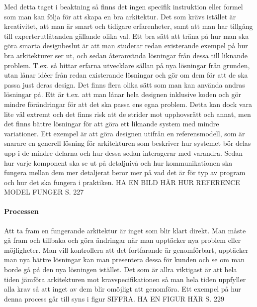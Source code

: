 Med detta taget i beaktning så finns det ingen specifik instruktion eller formel som man kan följa för att skapa en bra arkitektur. Det som krävs istället är kreativitet, att man är smart och tidigare erfarenheter, samt att man har tillgång till experterutlåtanden gällande olika val.
\newline
\newline
Ett bra sätt att träna på hur man ska göra smarta designbeslut är att man studerar redan existerande exempel på hur bra arkitekturer ser ut, och sedan återanvända lösningar från dessa till liknande problem. T.ex. så hittar erfarna utvecklare sällan på nya lösningar från grunden, utan lånar idéer från redan existerande lösningar och gör om dem för att de ska passa just deras design.
\newline
\newline
Det finns flera olika sätt som man kan använda andras lösningar på. Ett är t.ex. att man lånar hela designen inklusive koden och gör mindre förändringar för att det ska passa ens egna problem. Detta kan dock vara lite väl extremt och det finns risk att de strider mot upphovsrätt och annat, men det finns bättre lösningar för att göra ett liknande system med mindre variationer. Ett exempel är att göra designen utifrån en referensmodell, som är snarare en generell lösning för arkitekturen som beskriver hur systemet bör delas upp i de mindre delarna och hur dessa sedan interagerar med varandra. Sedan hur varje komponent ska se ut på detaljnivå och hur kommunikationen ska fungera mellan dem mer detaljerat beror mer på vad det är för typ av program och hur det ska fungera i praktiken.
HA EN BILD HÄR HUR REFERENCE MODEL FUNGER S. 227

\paragraph{Processen}
Att ta fram en fungerande arkitektur är inget som blir klart direkt. Man måste gå fram och tillbaka och göra ändringar när man upptäcker nya problem eller möjligheter. Man vill kontrollera att det fortfarande är genomförbart, upptäcker man nya bättre lösningar kan man presentera dessa för kunden och se om man borde gå på den nya lösningen istället. Det som är allra viktigast är att hela tiden jämföra arkitekturen mot kravspecifikationen så man hela tiden uppfyller alla krav så att inget av dem blir omöjligt att genomföra. Ett exempel på hur denna process går till syns i figur SIFFRA. HA EN FIGUR HÄR S. 229

